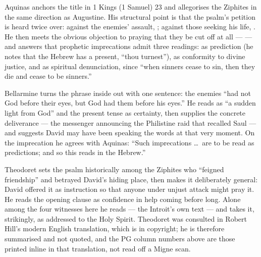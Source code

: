 \begin{witnessnote}
Aquinas anchors the title in 1 Kings (1 Samuel) 23 and allegorises the
Ziphites in the same direction as Augustine. His structural point is that the
psalm's petition is heard twice over: against the enemies' assault,
; against those seeking his life, . He then meets the obvious objection to praying
that they be cut off at all ---  --- and
answers that prophetic imprecations admit three readings: as prediction (he
notes that the Hebrew has a present, ``thou turnest''), as conformity to
divine justice, and as spiritual denunciation, since ``when sinners cease to
sin, then they die and cease to be sinners.''
\end{witnessnote}

\begin{witnessnote}
Bellarmine turns the phrase inside out with one sentence: the enemies ``had
not God before their eyes, but God had them before his eyes.'' He reads
 as ``a sudden light from God'' and the present tense as
certainty, then supplies the concrete deliverance --- the messenger announcing
the Philistine raid that recalled Saul --- and suggests David may have been
speaking the words at that very moment. On the imprecation he agrees with
Aquinas: ``Such imprecations \dots\ are to be read as predictions; and so this
reads in the Hebrew.''
\end{witnessnote}

\begin{witnessnote}
Theodoret sets the psalm historically among the Ziphites who ``feigned
friendship'' and betrayed David's hiding place, then makes it deliberately
general: David offered it as instruction so that anyone under unjust attack
might pray it. He reads the opening clause as confidence in help coming before
long. Alone among the four witnesses here he reads  ---
the Introit's own text --- and takes it, strikingly, as addressed to the Holy
Spirit. Theodoret was consulted in Robert Hill's modern English translation,
which is in copyright; he is therefore summarised and not quoted, and the PG column numbers above are those printed inline in that
translation, not read off a Migne scan.
\end{witnessnote}

